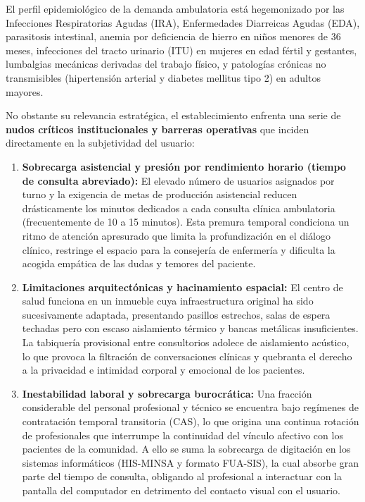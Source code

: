 El perfil epidemiológico de la demanda ambulatoria está hegemonizado por las Infecciones Respiratorias Agudas (IRA), Enfermedades Diarreicas Agudas (EDA), parasitosis intestinal, anemia por deficiencia de hierro en niños menores de 36 meses, infecciones del tracto urinario (ITU) en mujeres en edad fértil y gestantes, lumbalgias mecánicas derivadas del trabajo físico, y patologías crónicas no transmisibles (hipertensión arterial y diabetes mellitus tipo 2) en adultos mayores.

No obstante su relevancia estratégica, el establecimiento enfrenta una serie de \textbf{nudos críticos institucionales y barreras operativas} que inciden directamente en la subjetividad del usuario:
\begin{enumerate}
    \item \textbf{Sobrecarga asistencial y presión por rendimiento horario (tiempo de consulta abreviado):} El elevado número de usuarios asignados por turno y la exigencia de metas de producción asistencial reducen drásticamente los minutos dedicados a cada consulta clínica ambulatoria (frecuentemente de 10 a 15 minutos). Esta premura temporal condiciona un ritmo de atención apresurado que limita la profundización en el diálogo clínico, restringe el espacio para la consejería de enfermería y dificulta la acogida empática de las dudas y temores del paciente.
    \item \textbf{Limitaciones arquitectónicas y hacinamiento espacial:} El centro de salud funciona en un inmueble cuya infraestructura original ha sido sucesivamente adaptada, presentando pasillos estrechos, salas de espera techadas pero con escaso aislamiento térmico y bancas metálicas insuficientes. La tabiquería provisional entre consultorios adolece de aislamiento acústico, lo que provoca la filtración de conversaciones clínicas y quebranta el derecho a la privacidad e intimidad corporal y emocional de los pacientes.
    \item \textbf{Inestabilidad laboral y sobrecarga burocrática:} Una fracción considerable del personal profesional y técnico se encuentra bajo regímenes de contratación temporal transitoria (CAS), lo que origina una continua rotación de profesionales que interrumpe la continuidad del vínculo afectivo con los pacientes de la comunidad. A ello se suma la sobrecarga de digitación en los sistemas informáticos (HIS-MINSA y formato FUA-SIS), la cual absorbe gran parte del tiempo de consulta, obligando al profesional a interactuar con la pantalla del computador en detrimento del contacto visual con el usuario.
\end{enumerate}
